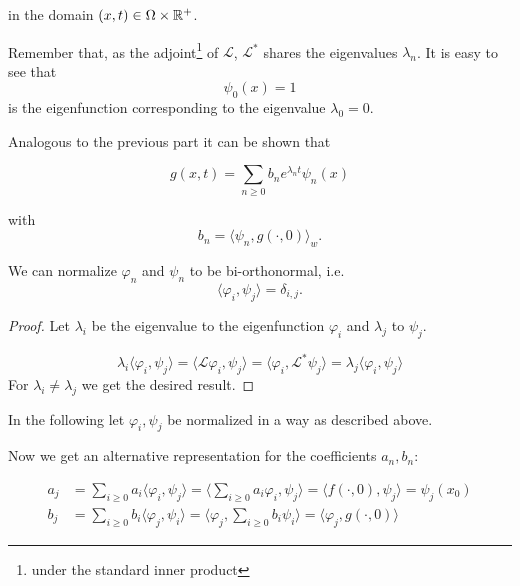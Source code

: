 in the domain $(x,t)\in \Omega\times\mathbb{R}^+$.

Remember that, as the adjoint\footnote{under the standard inner product} of $\mathcal{L}$, $\mathcal{L}^*$ shares the eigenvalues $\lambda_n$. It is easy to see that
\begin{equation}\label{eq:firstEigenfunctionConstant}
\psi_0(x)=1
\end{equation}
is the eigenfunction corresponding to the eigenvalue $\lambda_0 = 0$.

Analogous to the previous part it can be shown that

\begin{equation*}
g(x,t) = \sum_{n\geq 0} b_n e^{\lambda_n t}\psi_n(x)
\end{equation*}

with 
\begin{equation*}
b_n = \langle \psi_n, g(\cdot, 0) \rangle_w.
\end{equation*}

\begin{lemma}
We can normalize $\varphi_n$ and $\psi_n$ to be bi-orthonormal, i.e.
\begin{equation}\label{eq:biorthonormality}
\langle \varphi_i, \psi_j \rangle = \delta_{i,j}.
\end{equation}
\end{lemma}

\begin{proof}
Let $\lambda_i$ be the eigenvalue to the eigenfunction $\varphi_i$ and $\lambda_j$ to $\psi_j$.

\begin{equation*}
\lambda_i \langle \varphi_i, \psi_j \rangle =
\langle \mathcal{L}\varphi_i, \psi_j \rangle =
\langle \varphi_i, \mathcal{L}^*\psi_j \rangle =
\lambda_j \langle \varphi_i, \psi_j \rangle
\end{equation*}
For $\lambda_i \neq \lambda_j$ we get the desired result.
\end{proof}

In the following let $\varphi_i, \psi_j$ be normalized in a way as described above.

Now we get an alternative representation for the coefficients $a_n, b_n$:

\begin{equation}\label{eq:alternativeReprForCoefficients}\begin{aligned}
a_j&= \sum_{i\geq 0} a_i \langle \varphi_i, \psi_j \rangle
    = \langle \sum_{i\geq 0} a_i \varphi_i, \psi_j \rangle
    = \langle f(\cdot, 0), \psi_j \rangle = \psi_j(x_0)\\
b_j&= \sum_{i\geq 0} b_i \langle \varphi_j, \psi_i \rangle
    = \langle \varphi_j, \sum_{i\geq 0} b_i \psi_i \rangle
    = \langle \varphi_j, g(\cdot, 0) \rangle
\end{aligned}\end{equation}

